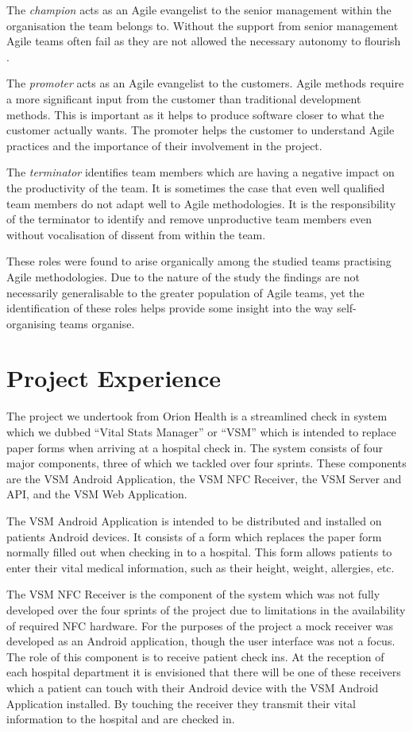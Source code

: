\documentclass[conference]{IEEEtran}
\begin{document}
The \emph{champion} acts as an Agile evangelist to the senior management within
the organisation the team belongs to. Without the support from senior management
Agile teams often fail as they are not allowed the necessary autonomy to
flourish \cite{hoda2010balancing}.

The \emph{promoter} acts as an Agile evangelist to the customers. Agile methods
require a more significant input from the customer than traditional development
methods. This is important as it helps to produce software closer to what the
customer actually wants. The promoter helps the customer to understand Agile
practices and the importance of their involvement in the project.

The \emph{terminator} identifies team members which are having a negative impact
on the productivity of the team. It is sometimes the case that even well
qualified team members do not adapt well to Agile methodologies. It is the
responsibility of the terminator to identify and remove unproductive team
members even without vocalisation of dissent from within the team.

These roles were found to arise organically among the studied teams practising
Agile methodologies. Due to the nature of the study the findings are not
necessarily generalisable to the greater population of Agile teams, yet the
identification of these roles helps provide some insight into the way self-
organising teams organise.

\section{Project Experience}\label{projexp}

The project we undertook from Orion Health is a streamlined check in system
which we dubbed ``Vital Stats Manager'' or ``VSM'' which is intended to replace
paper forms when arriving at a hospital check in. The system consists of four
major components, three of which we tackled over four sprints. These components
are the VSM Android Application, the VSM NFC Receiver, the VSM Server and API,
and the VSM Web Application.

The VSM Android Application \cite{vsmdrd} is intended to be distributed and
installed on patients Android devices. It consists of a form which replaces the
paper form normally filled out when checking in to a hospital. This form allows
patients to enter their vital medical information, such as their height, weight,
allergies, etc.

The VSM NFC Receiver \cite{vsmnfc} is the component of the system which was not
fully developed over the four sprints of the project due to limitations in the
availability of required NFC hardware. For the purposes of the project a mock
receiver was developed as an Android application, though the user interface was
not a focus. The role of this component is to receive patient check ins. At the
reception of each hospital department it is envisioned that there will be one of
these receivers which a patient can touch with their Android device with the VSM
Android Application installed. By touching the receiver they transmit their
vital information to the hospital and are checked in.
\end{document}
